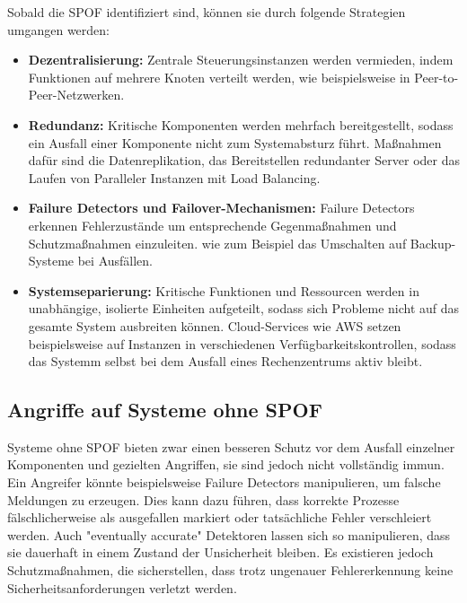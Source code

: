 \documentclass[a4paper,12pt]{article}
\begin{document}
Sobald die SPOF identifiziert sind, können sie durch folgende Strategien umgangen werden:

\begin{itemize}
    \item \textbf{Dezentralisierung:} Zentrale Steuerungsinstanzen werden vermieden, indem Funktionen auf mehrere Knoten verteilt werden, wie beispielsweise in Peer-to-Peer-Netzwerken.
    \item \textbf{Redundanz:} Kritische Komponenten werden mehrfach bereitgestellt, sodass ein Ausfall einer Komponente nicht zum Systemabsturz führt. Maßnahmen dafür sind die Datenreplikation, das Bereitstellen redundanter Server oder das Laufen von Paralleler Instanzen mit Load Balancing.
    \item \textbf{Failure Detectors und Failover-Mechanismen:} Failure Detectors erkennen Fehlerzustände um entsprechende Gegenmaßnahmen und Schutzmaßnahmen einzuleiten. wie zum Beispiel das Umschalten auf Backup-Systeme bei Ausfällen.
    \item \textbf{Systemseparierung:} Kritische Funktionen und Ressourcen werden in unabhängige, isolierte Einheiten aufgeteilt, sodass sich Probleme nicht auf das gesamte System ausbreiten können. Cloud-Services wie AWS setzen beispielsweise auf Instanzen in verschiedenen Verfügbarkeitskontrollen, sodass das Systemm selbst bei dem Ausfall eines Rechenzentrums aktiv bleibt.
\end{itemize}

\subsection{Angriffe auf Systeme ohne SPOF}
Systeme ohne SPOF bieten zwar einen besseren Schutz vor dem Ausfall einzelner Komponenten und gezielten Angriffen, sie sind jedoch nicht vollständig immun. Ein Angreifer könnte beispielsweise Failure Detectors manipulieren, um falsche Meldungen zu erzeugen. Dies kann dazu führen, dass korrekte Prozesse fälschlicherweise als ausgefallen markiert oder tatsächliche Fehler verschleiert werden. Auch "eventually accurate" Detektoren lassen sich so manipulieren, dass sie dauerhaft in einem Zustand der Unsicherheit bleiben. Es existieren jedoch Schutzmaßnahmen, die sicherstellen, dass trotz ungenauer Fehlererkennung keine Sicherheitsanforderungen verletzt werden. \cite{10.1145/1052796.1052806}


\end{document}
